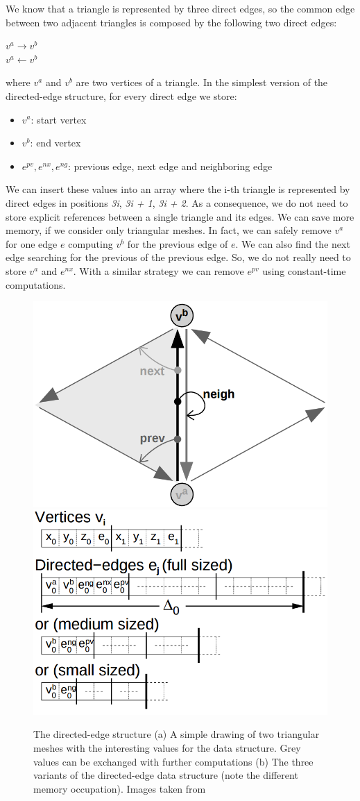 We know that a triangle is represented by three direct edges, so the common edge between two adjacent triangles is composed by the following two direct edges:
\begin{center}
   $v^{a} \rightarrow v^{b}$\\
   $v^{a} \leftarrow v^{b}$
\end{center}

where $v^{a}$ and $v^{b}$ are two vertices of a triangle. In the simplest version of the directed-edge structure, for every direct edge we store:
\begin{itemize}
 \item $v^{a}$: start vertex
 \item $v^{b}$: end vertex
 \item $e^{pv}, e^{nx}, e^{ng}$: previous edge, next edge and neighboring edge
\end{itemize}

We can insert these values into an array where the i-th triangle is represented by direct edges in positions \textit{3i}, \textit{3i + 1}, \textit{3i + 2}. As a consequence, we do not need to store explicit references between a single triangle and its edges. We can save more memory, if we consider only triangular meshes. In fact, we can safely remove $v^{a}$ for one edge $e$ computing $v^{b}$ for the previous edge of $e$. We can also find the next edge searching for the previous of the previous edge. So, we do not really need to store $v^{a}$ and $e^{nx}$. With a similar strategy we can remove $e^{pv}$ using constant-time computations.

\begin{figure}[htb] %
   \centering
   \includegraphics[width=0.45\linewidth]{images/directed-edge0.png}\hfill
   \includegraphics[width=0.45\linewidth]{images/directed-edge1.png}
   \caption[The directed-edge structure]{The directed-edge structure (a) A simple drawing of two triangular meshes with the interesting values for the data structure. Grey values can be exchanged with further computations (b) The three variants of the directed-edge data structure (note the different memory occupation). Images taken from~\cite{Campagna}}
   \label{fig:directedEdge}
\end{figure}

